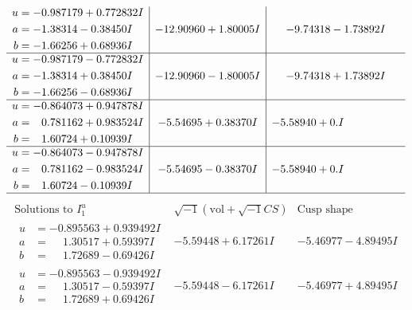 \documentclass[1p]{elsarticle_modified}
\theoremstyle{definition}
\newcommand{\I}{\sqrt{-1}}
\begin{document}
$$\begin{array}{c|c|c}
\begin{aligned}
u &= -0.987179 + 0.772832 I \\
a &= -1.38314 - 0.38450 I \\
b &= -1.66256 + 0.68936 I\end{aligned}
 & -12.90960 + 1.80005 I & -9.74318 - 1.73892 I \\ \hline\begin{aligned}
u &= -0.987179 - 0.772832 I \\
a &= -1.38314 + 0.38450 I \\
b &= -1.66256 - 0.68936 I\end{aligned}
 & -12.90960 - 1.80005 I & -9.74318 + 1.73892 I \\ \hline\begin{aligned}
u &= -0.864073 + 0.947878 I \\
a &= \phantom{-}0.781162 + 0.983524 I \\
b &= \phantom{-}1.60724 + 0.10939 I\end{aligned}
 & -5.54695 + 0.38370 I & -5.58940 + 0. I\phantom{ +0.000000I} \\ \hline\begin{aligned}
u &= -0.864073 - 0.947878 I \\
a &= \phantom{-}0.781162 - 0.983524 I \\
b &= \phantom{-}1.60724 - 0.10939 I\end{aligned}
 & -5.54695 - 0.38370 I & -5.58940 + 0. I\phantom{ +0.000000I}\\
 \hline 
 \end{array}$$\newpage$$\begin{array}{c|c|c}  
\text{Solutions to }I^u_{1}& \I (\text{vol} + \sqrt{-1}CS) & \text{Cusp shape}\\
 \hline 
\begin{aligned}
u &= -0.895563 + 0.939492 I \\
a &= \phantom{-}1.30517 + 0.59397 I \\
b &= \phantom{-}1.72689 - 0.69426 I\end{aligned}
 & -5.59448 + 6.17261 I & -5.46977 - 4.89495 I \\ \hline\begin{aligned}
u &= -0.895563 - 0.939492 I \\
a &= \phantom{-}1.30517 - 0.59397 I \\
b &= \phantom{-}1.72689 + 0.69426 I\end{aligned}
 & -5.59448 - 6.17261 I & -5.46977 + 4.89495 I \\ \hline\begin{aligned}

\end{aligned}
\end{array}$$
\end{document}

